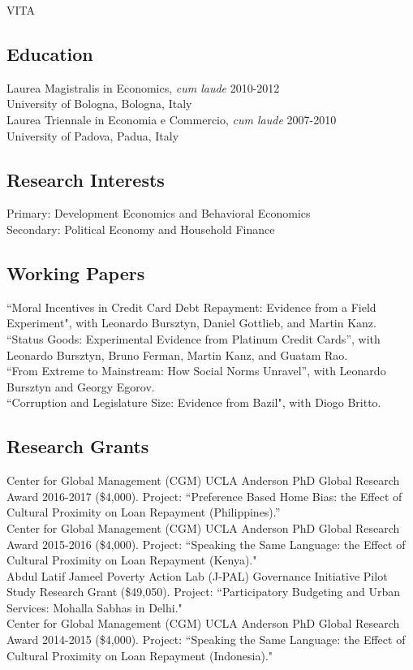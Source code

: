 \begin{center}
	VITA\par
\end{center}

\subsection*{Education}
%
Laurea Magistralis in Economics, \textit{cum laude} \hfill  2010-2012 \\
 University of Bologna, Bologna, Italy\\
Laurea Triennale in Economia e Commercio, \textit{cum laude} \hfill 2007-2010\\
 University of Padova, Padua, Italy\\

\subsection*{Research Interests}
Primary: Development Economics and Behavioral Economics\\
Secondary: Political Economy and Household Finance\\

\subsection*{Working Papers}
``Moral Incentives in Credit Card Debt Repayment: Evidence from a Field Experiment", with Leonardo Bursztyn, Daniel Gottlieb, and Martin Kanz.\\
``Status Goods: Experimental Evidence from Platinum Credit Cards'', with Leonardo Bursztyn, Bruno Ferman, Martin Kanz, and Guatam Rao.\\
``From Extreme to Mainstream: How Social Norms Unravel'', with Leonardo Bursztyn and Georgy Egorov.\\
``Corruption and Legislature Size: Evidence from Bazil", with Diogo Britto.\\

\subsection*{Research Grants}
Center for Global Management (CGM) UCLA Anderson PhD Global Research Award 2016-2017 (\$4,000). Project: ``Preference Based Home Bias: the Effect of Cultural Proximity on Loan Repayment (Philippines).''\\
Center for Global Management (CGM) UCLA Anderson PhD Global Research Award 2015-2016 (\$4,000). Project: ``Speaking the Same Language: the Effect of Cultural Proximity on Loan Repayment (Kenya)."\\
Abdul Latif Jameel Poverty Action Lab (J-PAL) Governance Initiative Pilot Study Research Grant (\$49,050). Project: ``Participatory Budgeting and Urban Services: Mohalla Sabhas in Delhi."\\
Center for Global Management (CGM) UCLA Anderson PhD Global Research Award 2014-2015 (\$4,000). Project: ``Speaking the Same Language: the Effect of Cultural Proximity on Loan Repayment (Indonesia)."\\

